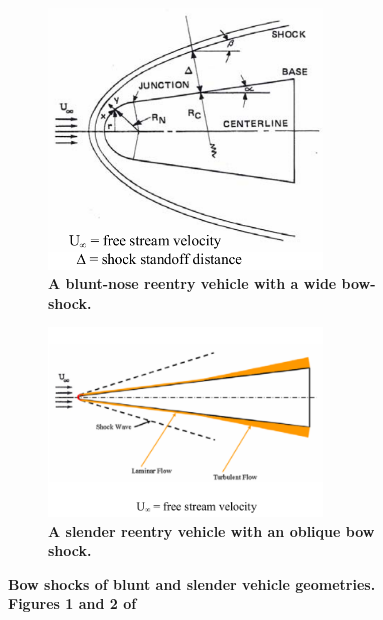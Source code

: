 \documentclass[twocolumn]{article}
\begin{document}
\begin{figure}[t]
	\centering
	\begin{subfigure}{0.5\textwidth}
		\includegraphics[width = 0.8\textwidth]{Images/BluntBody.png}
		\caption{\textbf{A blunt-nose reentry vehicle with a wide bow-shock.}}
		\label{subfig:BluntBody}
	\end{subfigure}%
	\begin{subfigure}{0.5\textwidth}
		\centering
		\includegraphics[width=0.8\textwidth]{Images/SlenderBody.png}
		\caption{\textbf{A slender reentry vehicle with an oblique bow shock.}}
		\label{subfig:SlenderBody}
	\end{subfigure}%
	\caption{\textbf{Bow shocks of blunt and slender vehicle geometries. Figures 1 and 2 of \cite{hartunian_implications_2007}}}
	\label{fig:BluntVsSlender}
\end{figure}
\end{document}
